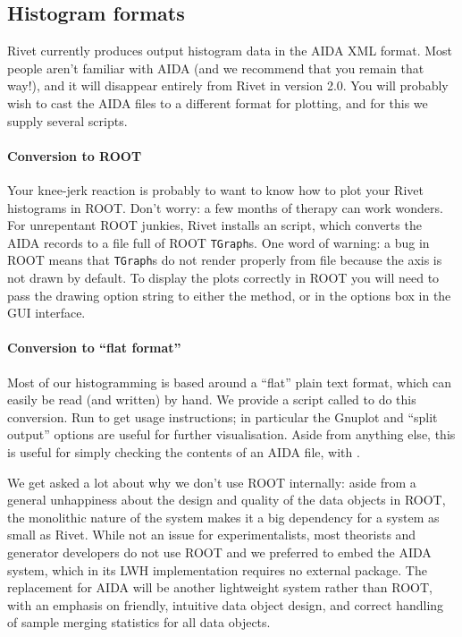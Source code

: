 \documentclass{JHEP3}
\begin{document}
\subsection{Histogram formats}

Rivet currently produces output histogram data in the AIDA XML format. Most
people aren't familiar with AIDA (and we recommend that you remain that way!),
and it will disappear entirely from Rivet in version 2.0. You will probably
wish to cast the AIDA files to a different format for plotting, and for this we
supply several scripts.

\paragraph{Conversion to ROOT}

Your knee-jerk reaction is probably to want to know how to plot your Rivet
histograms in ROOT\cite{Antcheva:2009zz}. Don't worry: a few months of therapy
can work wonders. For unrepentant ROOT junkies, Rivet installs an
 script, which converts the AIDA records to a  file
full of ROOT \texttt{TGraph}s. One word of warning: a bug in ROOT means that
\texttt{TGraph}s do not render properly from file because the axis is not drawn by
default. To display the plots correctly in ROOT you will need to pass the
 drawing option string to either the  method, or
in the options box in the  GUI interface.

\paragraph{Conversion to ``flat format''}

Most of our histogramming is based around a ``flat'' plain text format,
which can easily be read (and written) by hand. We provide a script called
 to do this conversion. Run  to get usage
instructions; in particular the Gnuplot and ``split output'' options are useful
for further visualisation. Aside from anything else, this is useful for simply
checking the contents of an AIDA file, with .

\vspace{1.8em}

\begin{detail}
  We get asked a lot about why we don't use ROOT internally: aside from a
  general unhappiness about the design and quality of the data objects in ROOT,
  the monolithic nature of the system makes it a big dependency for a system as
  small as Rivet. While not an issue for experimentalists, most theorists and
  generator developers do not use ROOT and we preferred to embed the AIDA
  system, which in its LWH implementation requires no external package. The
  replacement for AIDA will be another lightweight system rather than ROOT, with
  an emphasis on friendly, intuitive data object design, and correct handling of
  sample merging statistics for all data objects.
\end{detail}
\end{document}
